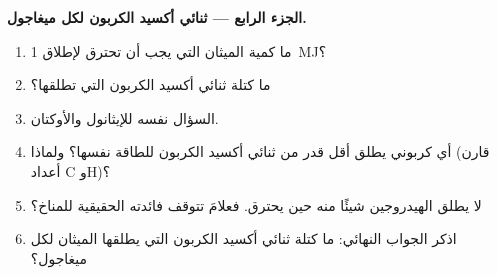 \begin{problem}
\medskip
\noindent\textbf{الجزء الرابع --- ثنائي أكسيد الكربون لكل ميغاجول.}
\begin{enumerate}[resume]
  \item ما كمية الميثان التي يجب أن تحترق لإطلاق \qty{1}{MJ}؟
  \item ما كتلة ثنائي أكسيد الكربون التي تطلقها؟
  \item السؤال نفسه للإيثانول والأوكتان.
  \item أي  كربوني يطلق أقل قدر من ثنائي أكسيد الكربون للطاقة
        نفسها؟ ولماذا (قارن أعداد  C وH)؟
  \item لا يطلق الهيدروجين شيئًا منه حين يحترق. فعلامَ تتوقف
        فائدته الحقيقية للمناخ؟
  \item اذكر الجواب النهائي: ما كتلة ثنائي أكسيد الكربون التي يطلقها الميثان
        لكل ميغاجول؟
\end{enumerate}
\end{problem}
